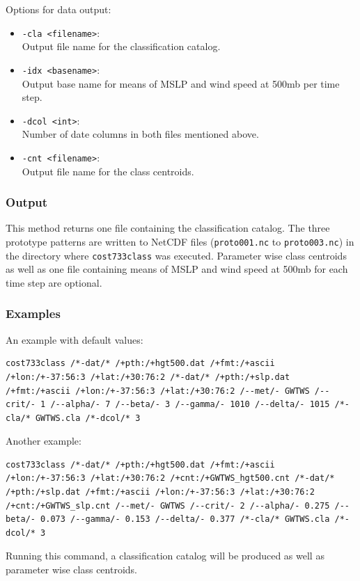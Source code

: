 \documentclass[12pt, oneside, a4paper, headsepline, plainheadsepline]{scrbook}
\begin{document}
Options for data output:
\begin{itemize}
 \item \verb+-cla <filename>+:\\ Output file name for the classification catalog.
 \item \verb+-idx <basename>+:\\ Output base name for means of MSLP and wind speed at 500mb per time step.
 \item \verb+-dcol <int>+:\\ Number of date columns in both files mentioned above.
 \item \verb+-cnt <filename>+:\\ Output file name for the class centroids.
\end{itemize}

\subsubsection*{Output}
This method returns one file containing the classification catalog. The three prototype patterns are written to NetCDF files (\verb+proto001.nc+ to \verb+proto003.nc+) in the directory where \verb+cost733class+ was executed.
Parameter wise class centroids as well as one file containing means of MSLP and wind speed at 500mb for each time step are optional.

\subsubsection*{Examples}
An example with default values:
\begin{lstlisting}
cost733class /*-dat/* /+pth:/+hgt500.dat /+fmt:/+ascii /+lon:/+-37:56:3 /+lat:/+30:76:2 /*-dat/* /+pth:/+slp.dat /+fmt:/+ascii /+lon:/+-37:56:3 /+lat:/+30:76:2 /--met/- GWTWS /--crit/- 1 /--alpha/- 7 /--beta/- 3 /--gamma/- 1010 /--delta/- 1015 /*-cla/* GWTWS.cla /*-dcol/* 3 
\end{lstlisting}
Another example:
\begin{lstlisting}
cost733class /*-dat/* /+pth:/+hgt500.dat /+fmt:/+ascii /+lon:/+-37:56:3 /+lat:/+30:76:2 /+cnt:/+GWTWS_hgt500.cnt /*-dat/* /+pth:/+slp.dat /+fmt:/+ascii /+lon:/+-37:56:3 /+lat:/+30:76:2 /+cnt:/+GWTWS_slp.cnt /--met/- GWTWS /--crit/- 2 /--alpha/- 0.275 /--beta/- 0.073 /--gamma/- 0.153 /--delta/- 0.377 /*-cla/* GWTWS.cla /*-dcol/* 3 
\end{lstlisting}
Running this command, a classification catalog will be produced as well as parameter wise class centroids.
\end{document}
